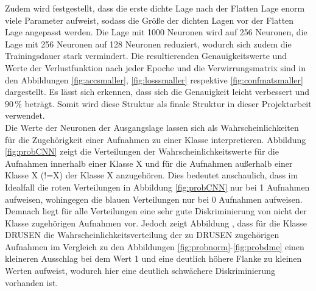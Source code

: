 \setcounter{subfigure}{0} 
Zudem wird festgestellt, dass die erste dichte Lage nach der Flatten Lage enorm viele Parameter aufweist, sodass die Größe der dichten Lagen vor der Flatten Lage angepasst werden. Die Lage mit 1000 Neuronen wird auf 256 Neuronen, die Lage mit 256 Neuronen auf 128 Neuronen reduziert, wodurch sich zudem die Trainingsdauer stark vermindert. Die resultierenden Genauigkeitswerte und Werte der Verlustfunktion nach jeder Epoche und die Verwirrungsmatrix sind in den Abbildungen \ref{fig:accsmaller}, \ref{fig:losssmaller} respektive \ref{fig:confmatsmaller} dargestellt. Es lässt sich erkennen, dass sich die Genauigkeit leicht verbessert und $90\,\%$ beträgt. Somit wird diese Struktur als finale Struktur in dieser Projektarbeit verwendet. \\
Die Werte der Neuronen der Ausgangslage lassen sich als Wahrscheinlichkeiten für die Zugehörigkeit einer Aufnahmen zu einer Klasse interpretieren. Abbildung \ref{fig:probCNN} zeigt die Verteilungen der Wahrscheinlichkeitswerte für die Aufnahmen innerhalb einer Klasse X und für die Aufnahmen außerhalb einer Klasse X (!=X) der Klasse X anzugehören. Dies bedeutet anschaulich, dass im Idealfall die roten Verteilungen in Abbildung \ref{fig:probCNN} nur bei 1 Aufnahmen aufweisen, wohingegen die blauen Verteilungen nur bei 0 Aufnahmen aufweisen. Demnach liegt für alle Verteilungen eine sehr gute Diskriminierung von nicht der Klasse zugehörigen Aufnahmen vor. Jedoch zeigt Abbildung \label{fig:probdrusen}, dass für die Klasse DRUSEN die Wahrscheinlichkeitsverteilung der zu DRUSEN zugehörigen Aufnahmen im Vergleich zu den Abbildungen \ref{fig:probnorm}-\ref{fig:probdme} einen kleineren Ausschlag bei dem Wert 1 und eine deutlich höhere Flanke zu kleinen Werten aufweist, wodurch hier eine deutlich schwächere Diskriminierung vorhanden ist.  
 


